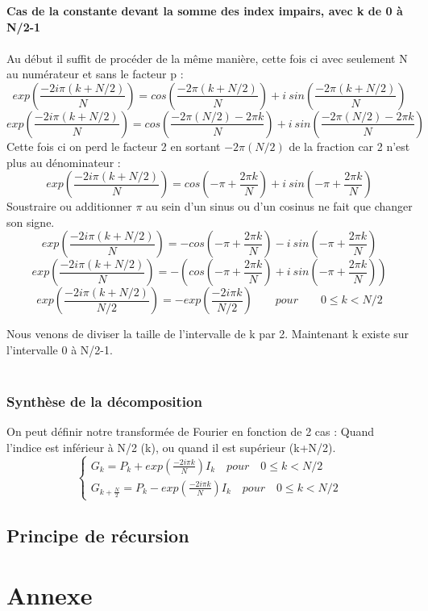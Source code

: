 \documentclass{article}
\begin{document}
\noindent\qquad \textbf{Cas de la constante devant la somme des index impairs, avec k de 0 à N/2-1}\\~\\
Au début il suffit de procéder de la même manière, cette fois ci avec seulement N au numérateur et sans le facteur p :
\begin{equation}
	exp(\frac{-2i\pi (k+N/2)}{N}) = cos(\frac{-2\pi (k+N/2)}{N})+i\:sin(\frac{-2\pi (k+N/2)}{N})
\end{equation}
\begin{equation}
	exp(\frac{-2i\pi (k+N/2)}{N}) = cos(\frac{-2\pi (N/2)-2\pi k}{N})+i\:sin(\frac{-2\pi (N/2)-2\pi k}{N})
\end{equation}
Cette fois ci on perd le facteur 2 en sortant $-2\pi (N/2)$ de la fraction car 2 n'est plus au dénominateur :
\begin{equation}
	exp(\frac{-2i\pi (k+N/2)}{N}) = cos(-\pi +\frac{2\pi k}{N})+i\:sin(-\pi +\frac{2\pi k}{N})
\end{equation}
Soustraire ou additionner $\pi$ au sein d'un sinus ou d'un cosinus ne fait que changer son signe. 
\begin{equation}
	exp(\frac{-2i\pi (k+N/2)}{N}) = - cos(-\pi +\frac{2\pi k}{N})-i\:sin(-\pi +\frac{2\pi k}{N})
\end{equation}
\begin{equation}
	exp(\frac{-2i\pi (k+N/2)}{N}) = - ( cos(-\pi +\frac{2\pi k}{N})+i\:sin(-\pi +\frac{2\pi k}{N}))
\end{equation}
\begin{equation}
	exp(\frac{-2i\pi (k+N/2)}{N/2}) = - exp(\frac{-2i\pi k}{N/2}) \qquad pour \qquad 0 \leq k < N/2
\end{equation}

Nous venons de diviser la taille de l'intervalle de k par 2. Maintenant k existe sur l'intervalle 0 à N/2-1.\\~\\

\subsubsection{Synthèse de la décomposition}
On peut définir notre transformée de Fourier en fonction de 2 cas : Quand l'indice est inférieur à N/2 (k), ou quand il est supérieur (k+N/2).
\begin{equation}
	\begin{cases}
		G_{k} = P_{k} + exp(\frac{-2i\pi k}{N}) I_{k} \quad pour \quad 0 \leq k < N/2\\
		G_{k+\frac{N}{2}} = P_{k} - exp(\frac{-2i\pi k}{N}) I_{k} \quad pour \quad 0 \leq k < N/2
	\end{cases}
\end{equation}


\subsection{Principe de récursion}




\section{Annexe}
\end{document}
